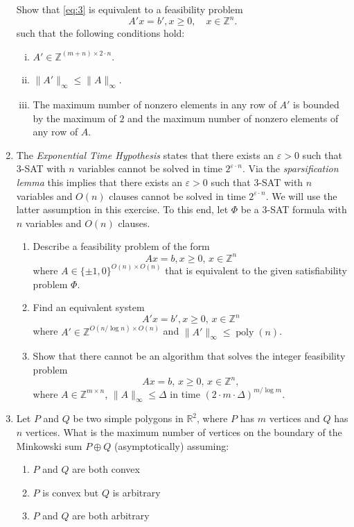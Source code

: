 \documentclass[11pt,a4paper]{article}
\DeclareMathOperator{\poly}{poly}
\begin{document}
\begin{enumerate}
  Show that \eqref{eq:3} is equivalent to a feasibility problem
  \begin{displaymath}
    A'x = b', x≥0, \quad x ∈ ℤ^n.    
  \end{displaymath}
  such that the following conditions hold:
  \begin{enumerate}[i)] 
  \item $A' ∈ℤ^{ (m+n) ×2⋅n}$. 
  \item $\|A' \|_∞ ≤  \|A\|_∞$.
  \item The maximum number of nonzero elements in any row of $A'$ is
    bounded by the maximum of $2$ and the maximum number of nonzero
    elements of any row of $A$.
  \end{enumerate}

\item The \emph{Exponential Time Hypothesis} states that there exists an $ε>0$ such that   $3$-SAT  with $n$ variables cannot be solved in time $2^{ε ⋅n}$. Via the \emph{sparsification lemma} this implies that there exists an $ε>0$ such that   $3$-SAT  with $n$ variables and $O(n)$ clauses cannot be solved in time $2^{ε ⋅n}$.  We will use the latter assumption in this exercise. To this end, let $Φ$ be a $3$-SAT formula with $n$ variables and $O(n)$ clauses. 
  \begin{enumerate}
  \item Describe a feasibility problem of the form
    \begin{displaymath}
      Ax = b, x≥0, \, x ∈ ℤ^n 
    \end{displaymath}
    where $A ∈ \{ \pm 1,0 \}^{O(n) × O(n)}$ that is equivalent to the given satisfiability problem $Φ$. 
  \item  Find an equivalent system
    \begin{displaymath}
      A'x = b', x≥0, \, x ∈ ℤ^n 
    \end{displaymath}
    where $A' ∈ ℤ^{O(n / \log n) × O(n)}$ and $\|A'\|_∞ ≤\poly (n)$.
  \item Show that there cannot be an algorithm that solves the integer feasibility problem
    \begin{displaymath}
      Ax = b, \, x≥ 0, \, x ∈ℤ^n, 
    \end{displaymath}
    where $A ∈ ℤ^{m ×n}$, $\|A\|_∞ ≤Δ$ in time $ (2 ⋅m ⋅Δ)^{m / \log m}$. 
    
  \end{enumerate}
  
  
\item Let $P$ and $Q$ be two simple polygons in $\mathbb{R}^2$, where $P$ has $m$ vertices and $Q$ has $n$ vertices. What is the maximum number of vertices on the boundary of the Minkowski sum $P ⊕ Q$ (asymptotically) assuming:
\begin{enumerate}
    \item $P$ and $Q$ are both convex
    \item $P$ is convex but $Q$ is arbitrary
    \item $P$ and $Q$ are both arbitrary
\end{enumerate}


\end{enumerate}
\end{document}

